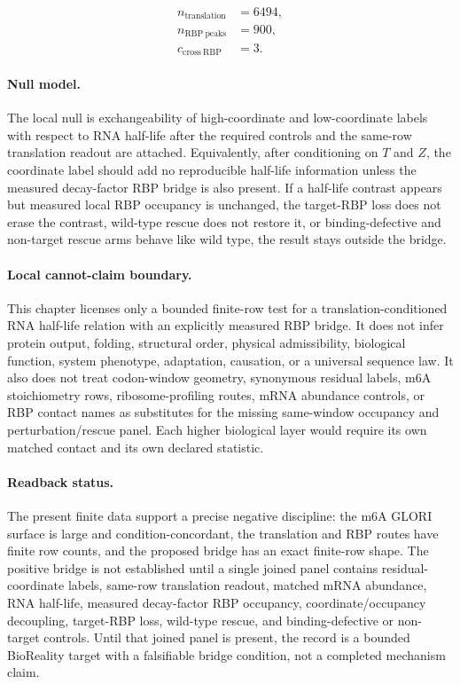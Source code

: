 $$
\begin{aligned}
 n_{\mathrm{translation}} &= 6494,\\
 n_{\mathrm{RBP\ peaks}} &= 900,\\
 c_{\mathrm{cross\ RBP}} &= 3.
\end{aligned}
$$

\paragraph{Null model.}
The local null is exchangeability of high-coordinate and low-coordinate labels with respect to RNA half-life after the required controls and the same-row translation readout are attached.  Equivalently, after conditioning on $T$ and $Z$, the coordinate label should add no reproducible half-life information unless the measured decay-factor RBP bridge is also present.  If a half-life contrast appears but measured local RBP occupancy is unchanged, the target-RBP loss does not erase the contrast, wild-type rescue does not restore it, or binding-defective and non-target rescue arms behave like wild type, the result stays outside the bridge.

\paragraph{Local cannot-claim boundary.}
This chapter licenses only a bounded finite-row test for a translation-conditioned RNA half-life relation with an explicitly measured RBP bridge.  It does not infer protein output, folding, structural order, physical admissibility, biological function, system phenotype, adaptation, causation, or a universal sequence law.  It also does not treat codon-window geometry, synonymous residual labels, m6A stoichiometry rows, ribosome-profiling routes, mRNA abundance controls, or RBP contact names as substitutes for the missing same-window occupancy and perturbation/rescue panel.  Each higher biological layer would require its own matched contact and its own declared statistic.

\paragraph{Readback status.}
The present finite data support a precise negative discipline: the m6A GLORI surface is large and condition-concordant, the translation and RBP routes have finite row counts, and the proposed bridge has an exact finite-row shape.  The positive bridge is not established until a single joined panel contains residual-coordinate labels, same-row translation readout, matched mRNA abundance, RNA half-life, measured decay-factor RBP occupancy, coordinate/occupancy decoupling, target-RBP loss, wild-type rescue, and binding-defective or non-target controls.  Until that joined panel is present, the record is a bounded BioReality target with a falsifiable bridge condition, not a completed mechanism claim.